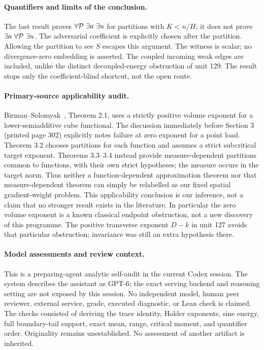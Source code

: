 \documentclass[11pt]{article}
\begin{document}
\paragraph{Quantifiers and limits of the conclusion.}
The last result proves $\forall{\cal P}\ \exists a\ \exists u$ for partitions
with $K<n/H$; it does not prove $\exists a\ \forall{\cal P}\ \exists u$.
The adversarial coefficient is explicitly chosen after the partition.
Allowing the partition to see $S$ escapes this argument. The witness is scalar;
no divergence-zero embedding is asserted. The coupled incoming weak edges are
included, unlike the distinct decoupled-energy obstruction of unit 129.
The result stops only the coefficient-blind shortcut, not the open route.

\paragraph{Primary-source applicability audit.}
Birman--Solomyak~\cite{BS67}, Theorem 2.1, uses a strictly positive
volume exponent for a lower-semiadditive cube functional. The discussion
immediately before Section 3 (printed page 302) explicitly notes failure at
zero exponent for a point load. Theorem 3.2 chooses partitions for each
function and assumes a strict subcritical target exponent. Theorems 3.3--3.4
instead provide measure-dependent partitions common to functions, with their
own strict hypotheses; the measure occurs in the target norm.
Thus neither a function-dependent approximation theorem nor that
measure-dependent theorem can simply be relabelled as our fixed spatial
gradient-weight problem. This applicability conclusion is our inference, not
a claim that no stronger result exists in the literature. In particular the
zero volume exponent is a known classical endpoint obstruction, not a new
discovery of this programme. The positive transverse exponent $D-k$ in unit
127 avoids that particular obstruction; invariance was still an extra
hypothesis there.

\paragraph{Model assessments and review context.}
This is a preparing-agent analytic self-audit in the current Codex session.
The system describes the assistant as GPT-6; the exact serving backend and
reasoning setting are not exposed by this session. No independent model,
human peer reviewer, external service, grade, executed diagnostic, or Lean
check is claimed. The checks consisted of deriving the trace identity,
Holder exponents, sine energy, full boundary-tail support, exact mean,
range, critical moment, and quantifier order. Originality remains
unestablished. No assessment of another artifact is inherited.
\end{document}

